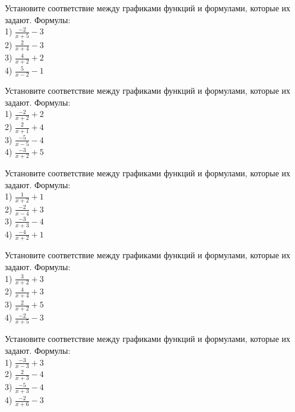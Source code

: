 \documentclass[4apaper]{article}
\begin{document}
\begin{taskBN}{26}
Установите соответствие между графиками функций и формулами, которые их задают. Формулы: \\1) $\frac{-2}{x+5}-3$\\2) $\frac{2}{x+4}-3$\\3) $\frac{4}{x+2}+2$\\4) $\frac{5}{x-2}-1$
\end{taskBN}

\begin{taskBN}{27}
Установите соответствие между графиками функций и формулами, которые их задают. Формулы: \\1) $\frac{-2}{x+2}+2$\\2) $\frac{2}{x+1}+4$\\3) $\frac{-5}{x-5}-4$\\4) $\frac{-3}{x+2}+5$
\end{taskBN}

\begin{taskBN}{28}
Установите соответствие между графиками функций и формулами, которые их задают. Формулы: \\1) $\frac{1}{x+2}+1$\\2) $\frac{-2}{x-4}+3$\\3) $\frac{-3}{x+3}-4$\\4) $\frac{-4}{x+2}+1$
\end{taskBN}

\begin{taskBN}{29}
Установите соответствие между графиками функций и формулами, которые их задают. Формулы: \\1) $\frac{3}{x+2}+3$\\2) $\frac{4}{x+4}+3$\\3) $\frac{2}{x+2}+5$\\4) $\frac{-2}{x+5}-3$
\end{taskBN}

\begin{taskBN}{30}
Установите соответствие между графиками функций и формулами, которые их задают. Формулы: \\1) $\frac{-3}{x-3}+3$\\2) $\frac{2}{x+3}-4$\\3) $\frac{-5}{x+3}-4$\\4) $\frac{-2}{x+6}-3$
\end{taskBN}
\end{document}

